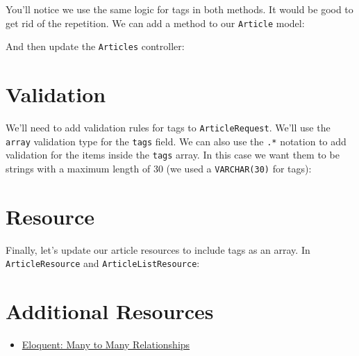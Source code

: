 You'll notice we use the same logic for tags in both methods. It would be good to get rid of the repetition. We can add a method to our \texttt{Article} model:


And then update the \texttt{Articles} controller:



\section{Validation}

We'll need to add validation rules for tags to \texttt{ArticleRequest}. We'll use the \texttt{array} validation type for the \texttt{tags} field. We can also use the \texttt{.*} notation to add validation for the items inside the \texttt{tags} array. In this case we want them to be strings with a maximum length of 30 (we used a \texttt{VARCHAR(30)} for tags):



\section{Resource}

Finally, let's update our article resources to include tags as an array. In \texttt{ArticleResource} and \texttt{ArticleListResource}:




\section{Additional Resources}

\begin{itemize}[leftmargin=*]
    \item \href{http://laravel.com/docs/master/eloquent-relationships#many-to-many}{Eloquent: Many to Many Relationships}
\end{itemize}
